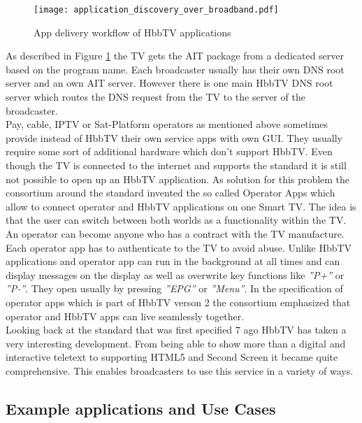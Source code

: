 \begin{figure}[htb]
  \centering
  \texttt{[image: application\_discovery\_over\_broadband.pdf]}\\
  \caption{App delivery workflow of HbbTV applications}\label{fig:application_discovery_over_broadband}
\end{figure}

As described in Figure \ref{fig:application_discovery_over_broadband} the TV gets the AIT package
from a dedicated server based on the program name. Each broadcaster usually has their own DNS
root server and an own AIT server. However there is one main HbbTV DNS root server which routes the
DNS request from the TV to the server of the broadcaster.\\
Pay, cable, IPTV or Sat-Platform operators as mentioned above sometimes provide instead of HbbTV
their own service apps with own GUI. They usually require some sort of additional hardware which
don't support HbbTV. Even though the TV is connected to the internet and supports the standard
it is still not possible to open up an HbbTV application. As solution for this problem the
consortium around the standard invented the so called Operator Apps which allow to connect
operator and HbbTV applications on one Smart TV. The idea is that the user can switch between
both worlds as a functionality within the TV. An operator can become anyone who has a contract
with the TV manufacture. Each operator app has to authenticate to the TV to avoid abuse. Unlike
HbbTV applications and operator app can run in the background at all times and can display
messages on the display as well as overwrite key functions like \textit{''P+''} or \textit{''P-''}.
They open usually by pressing \textit{''EPG''} or \textit{''Menu''}. In the specification of
operator apps which is part of HbbTV verson 2 the consortium emphasized that operator and HbbTV
apps can live seamlessly together.\\
Looking back at the standard that was first specified 7 ago HbbTV has taken a very interesting
development. From being able to show more than a digital and interactive teletext to supporting
HTML5 and Second Screen it became quite comprehensive. This enables broadcasters to use this
service in a variety of ways.

\subsection{Example applications and Use Cases}

